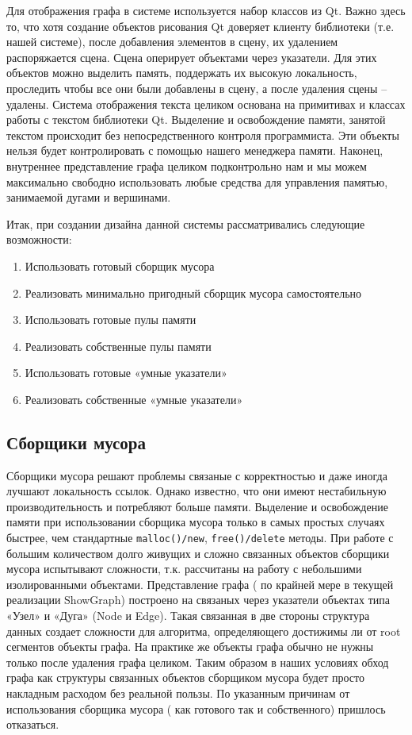 \documentclass{article}
\begin{document}
Для отображения графа в системе используется набор классов из Qt. Важно здесь то, что хотя создание объектов рисования Qt доверяет клиенту библиотеки (т.е. нашей системе), после добавления элементов в сцену, их удалением распоряжается сцена. Сцена оперирует объектами через указатели. Для этих объектов можно выделить память, поддержать их высокую локальность, проследить чтобы все они были добавлены в сцену, а после удаления сцены -- удалены. Система отображения текста целиком основана на примитивах и классах работы с текстом библиотеки Qt. Выделение и освобождение памяти, занятой текстом происходит без непосредственного контроля программиста. Эти объекты нельзя будет контролировать с помощью нашего менеджера памяти. Наконец, внутреннее представление графа целиком подконтрольно нам и мы можем максимально свободно использовать любые средства для управления памятью, занимаемой дугами и вершинами.

Итак, при создании дизайна данной системы рассматривались следующие возможности:
\begin{enumerate}
\item  Использовать готовый сборщик мусора

\item  Реализовать минимально пригодный сборщик мусора самостоятельно

\item  Использовать готовые пулы памяти

\item  Реализовать собственные пулы памяти

\item  Использовать готовые «умные указатели»

\item  Реализовать собственные «умные указатели»
\end{enumerate}

\subsection{Сборщики мусора}
Сборщики мусора решают проблемы связаные с корректностью и даже иногда лучшают локальность ссылок. Однако известно, что они имеют нестабильную производительность и потребляют больше памяти. Выделение и освобождение памяти при использовании сборщика мусора только в самых простых случаях быстрее, чем стандартные \lstinline{malloc()/new}, \lstinline{free()/delete} методы. При работе с большим количеством долго живущих и сложно связанных объектов сборщики мусора испытывают сложности, т.к. рассчитаны на работу с небольшими изолированными объектами. Представление графа ( по крайней мере в текущей реализации ShowGraph) построено на связаных через указатели объектах типа «Узел» и «Дуга» (Node и Edge). Такая связанная в две стороны структура данных создает сложности для алгоритма, определяющего достижимы ли от root сегментов объекты графа. На практике же объекты графа обычно не нужны только после удаления графа целиком. Таким образом в наших условиях обход графа как структуры связанных объектов сборщиком мусора будет просто накладным расходом без реальной пользы. По указанным причинам от использования сборщика мусора ( как готового так и собственного) пришлось отказаться.
\end{document}
